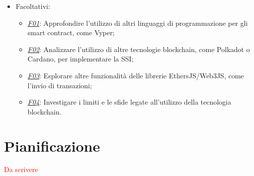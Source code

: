 \begin{itemize}
    \item Facoltativi:
        \begin{itemize}
            \item \underline{\textit{F01}}: Approfondire l'utilizzo di altri linguaggi di programmazione per gli smart contract, come Vyper;
            \item \underline{\textit{F02}}: Analizzare l'utilizzo di altre tecnologie blockchain, come Polkadot o Cardano, per implementare la SSI;
            \item \underline{\textit{F03}}: Esplorare altre funzionalità delle librerie EthersJS/Web3JS, come l'invio di transazioni;
            \item \underline{\textit{F04}}: Investigare i limiti e le sfide legate all'utilizzo della tecnologia blockchain.
        \end{itemize}
    
\end{itemize}


\section{Pianificazione}
\textcolor{red}{Da scrivere}
